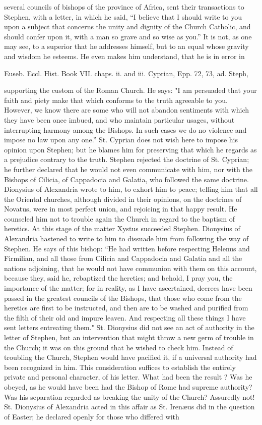 several councils of bishops of the province of Africa, sent their transactions to Stephen, with a letter, in which he said, “I believe that I should write to you upon a subject that concerns the unity and dignity of the Church Catholic, and should confer upon it, with a man so grave and so wise as you.” It is not, as one may see, to a superior that he addresses himself, but to an equal whose gravity and wisdom he esteems. He even makes him understand, that he is in error in

Euseb. Eccl. Hist. Book VII. chaps. ii. and iii. Cyprian, Epp. 72, 73, ad. Steph,

supporting the custom of the Roman Church. He says: "I am persuaded that your faith and piety make that which conforms to the truth agreeable to you. However, we know there are some who will not abandon sentiments with which they have been once imbued, and who maintain particular usages, without interrupting harmony among the Bishops. In such cases we do no violence and impose no law upon any one.” St. Cyprian does not wish here to impose his opinion upon Stephen; but he blames him for preserving that which he regards as a prejudice contrary to the truth. Stephen rejected the doctrine of St. Cyprian; he further declared that he would not even communicate with him, nor with the Bishops of Cilicia, of Cappadocia and Galatia, who followed the same doctrine. Dionysius of Alexandria wrote to him, to exhort him to peace; telling him that all the Oriental churches, although divided in their opinions, on the doctrines of Novatus, were in most perfect union, and rejoicing in that happy result. He counseled him not to trouble again the Church in regard to the baptism of heretics. At this stage of the matter Xystus succeeded Stephen. Dionysius of Alexandria hastened to write to him to dissuade him from following the way of Stephen. He says of this bishop: “He had written before respecting Helenus and Firmilian, and all those from Cilicia and Cappadocia and Galatia and all the nations adjoining, that he would not have communion with them on this account, because they, said he, rebaptized the heretics; and behold, I pray you, the importance of the matter; for in reality, as I have ascertained, decrees have been passed in the greatest councils of the Bishops, that those who come from the heretics are first to be instructed, and then are to be washed and purified from the filth of their old and impure leaven. And respecting all these things I have sent letters entreating them." St. Dionysius did not see an act of authority in the letter of Stephen, but an intervention that might throw a new germ of trouble in the Church; it was on this ground that he wished to check him. Instead of troubling the Church, Stephen would have pacified it, if a universal authority had been recognized in him. This consideration suffices to establish the entirely private and personal character, of his letter. What had been the result ? Was he obeyed, as he would have been had the Bishop of Rome had supreme authority? Was his separation regarded as breaking the unity of the Church? Assuredly not! St. Dionysius of Alexandria acted in this affair as St. Irenæus did in the question of Easter; he declared openly for those who differed with 